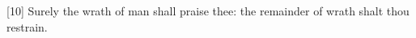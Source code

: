 [10] \textcolor[cmyk]{0.99998,1,0,0}{Surely the wrath of man shall praise thee: the remainder of wrath shalt thou restrain.} %